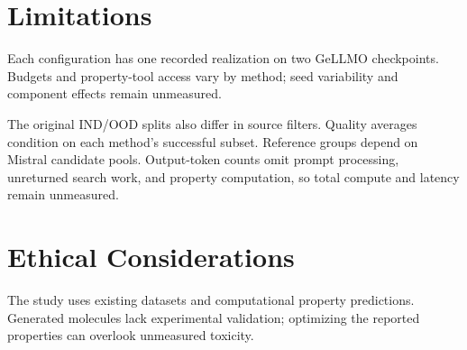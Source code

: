 \section*{Limitations}
Each configuration has one recorded realization on two GeLLMO checkpoints. Budgets and property-tool access vary by method; seed variability and component effects remain unmeasured.

The original IND/OOD splits also differ in source filters. Quality averages condition on each method's successful subset. Reference groups depend on Mistral candidate pools. Output-token counts omit prompt processing, unreturned search work, and property computation, so total compute and latency remain unmeasured.

\section*{Ethical Considerations}
The study uses existing datasets and computational property predictions. Generated molecules lack experimental validation; optimizing the reported properties can overlook unmeasured toxicity.
